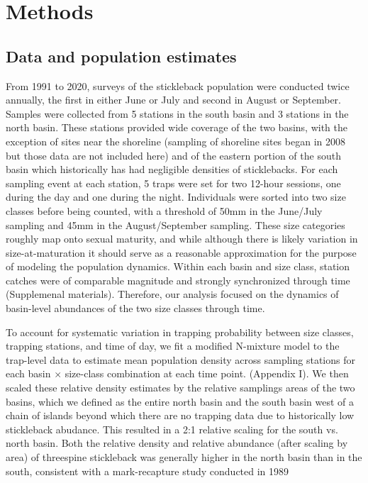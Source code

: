 \section*{Methods} 



\subsection*{Data and population estimates} 

From 1991 to 2020, surveys of the stickleback population were conducted twice annually, 
the first in either June or July and second in August or September. 
Samples were collected from 5 stations in the south basin and 3 stations in the north basin.
These stations provided wide coverage of the two basins, 
with the exception of sites near the shoreline 
(sampling of shoreline sites began in 2008 but those data are not included here)
and of the eastern portion of the south basin which historically has had negligible 
densities of sticklebacks.
For each sampling event at each station, 
5 traps were set for two 12-hour sessions, 
one during the day and one during the night.
Individuals were sorted into two size classes before being counted,
with a threshold of 50mm in the June/July sampling and 45mm in the August/September sampling.
These size categories roughly map onto sexual maturity,
and while although there is likely variation in size-at-maturation \citep{singkam2019}
it should serve as a reasonable approximation for the purpose 
of modeling the population dynamics.
Within each basin and size class, 
station catches were of comparable magnitude and 
strongly synchronized through time (Supplemenal materials).
Therefore, our analysis focused on the dynamics of basin-level abundances
of the two size classes through time.

To account for systematic variation in trapping probability between size classes,
trapping stations, and time of day, 
we fit a modified N-mixture model \citep{royle2004}
to the trap-level data to estimate mean population density across sampling stations 
for each basin $\times$ size-class combination at each time point.
(Appendix I). 
We then scaled these relative density estimates by the relative samplings areas 
of the two basins, 
which we defined as the entire north basin and the south basin west of a chain
of islands beyond which there are no trapping data 
due to historically low stickleback abudance.
This resulted in a 2:1 relative scaling for the south vs. north basin.
Both the relative density and relative abundance (after scaling by area) of threespine
stickleback was generally higher in the north basin than in the south,
consistent with a mark-recapture study conducted in 1989 \citep{gislason1998}



